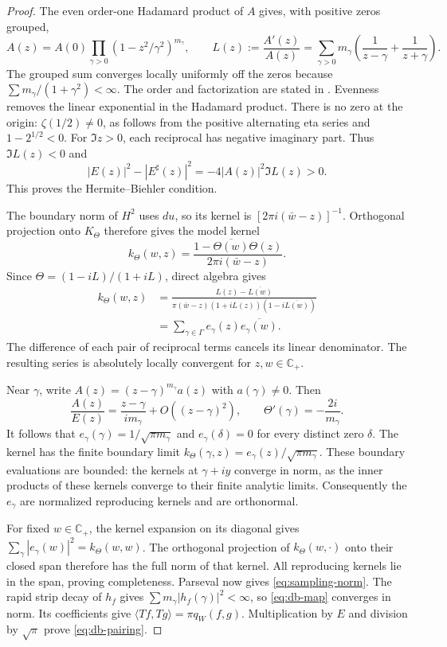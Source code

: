 \documentclass[11pt]{article}
\begin{document}
\begin{proof}
The even order-one Hadamard product of $A$ gives, with positive zeros grouped,
\[
 A(z)=A(0)\prod_{\gamma>0}(1-z^2/\gamma^2)^{m_\gamma},\qquad
 L(z):=\frac{A'(z)}{A(z)}
   =\sum_{\gamma>0}m_\gamma
          \left(\frac1{z-\gamma}+\frac1{z+\gamma}\right).
\]
The grouped sum converges locally uniformly off the zeros because
$\sum m_\gamma/(1+\gamma^2)<\infty$.
The order and factorization are stated in \cite[Theorem~1 and proof, p.~9]{lagarias}.
Evenness removes the linear exponential in the Hadamard product.
There is no zero at the origin: $\zeta(1/2)\ne0$, as follows from
the positive alternating eta series and $1-2^{1/2}<0$.
For $\Im z>0$, each reciprocal has negative imaginary part.
Thus $\Im L(z)<0$ and
\[
 |E(z)|^2-|E^\sharp(z)|^2=-4|A(z)|^2\Im L(z)>0.
\]
This proves the Hermite--Biehler condition.

The boundary norm of $H^2$ uses $du$, so its kernel is
$[2\pi i(\bar w-z)]^{-1}$.
Orthogonal projection onto $K_\Theta$ therefore gives the model kernel
\[
 k_\Theta(w,z)=\frac{1-\overline{\Theta(w)}\Theta(z)}{2\pi i(\bar w-z)}.
\]
Since $\Theta=(1-iL)/(1+iL)$, direct algebra gives
\begin{align*}
 k_\Theta(w,z)
 &=\frac{L(z)-\overline{L(w)}}{
       \pi(\bar w-z)(1+iL(z))(1-i\overline{L(w)})}\\
 &=\sum_{\gamma\in\Gamma}e_\gamma(z)\overline{e_\gamma(w)}.
\end{align*}
The difference of each pair of reciprocal terms cancels its linear denominator.
The resulting series is absolutely locally convergent for $z,w\in\mathbb C_+$.

Near $\gamma$, write $A(z)=(z-\gamma)^{m_\gamma}a(z)$ with $a(\gamma)\ne0$.
Then
\[
 \frac{A(z)}{E(z)}=\frac{z-\gamma}{im_\gamma}+O((z-\gamma)^2),\qquad
 \Theta'(\gamma)=-\frac{2i}{m_\gamma}.
\]
It follows that
$e_\gamma(\gamma)=1/\sqrt{\pi m_\gamma}$ and
$e_\gamma(\delta)=0$ for every distinct zero $\delta$.
The kernel has the finite boundary limit
$k_\Theta(\gamma,z)=e_\gamma(z)/\sqrt{\pi m_\gamma}$.
These boundary evaluations are bounded: the kernels at $\gamma+iy$
converge in norm, as the inner products of these kernels converge to their finite analytic limits.
Consequently the $e_\gamma$ are normalized reproducing kernels and are orthonormal.

For fixed $w\in\mathbb C_+$, the kernel expansion on its diagonal gives
$\sum_\gamma|e_\gamma(w)|^2=k_\Theta(w,w)$.
The orthogonal projection of $k_\Theta(w,\cdot)$ onto their closed span
therefore has the full norm of that kernel.
All reproducing kernels lie in the span, proving completeness.
Parseval now gives \eqref{eq:sampling-norm}.
The rapid strip decay of $h_f$ gives
$\sum m_\gamma|h_f(\gamma)|^2<\infty$, so \eqref{eq:db-map} converges in norm.
Its coefficients give
$\langle Tf,Tg\rangle=\pi q_W(f,g)$.
Multiplication by $E$ and division by $\sqrt\pi$ prove \eqref{eq:db-pairing}.
\end{proof}
\end{document}
